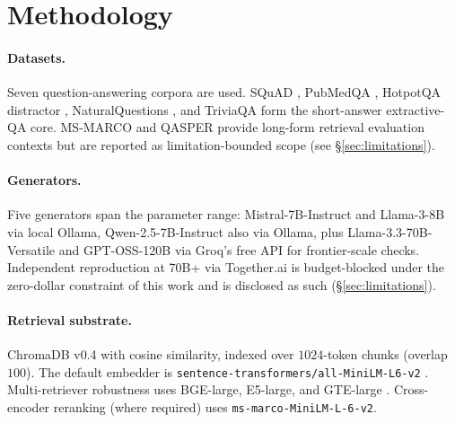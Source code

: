 \section{Methodology}
\label{sec:methodology}

\paragraph{Datasets.}
Seven question-answering corpora are used. SQuAD
\citep{rajpurkar2016squad}, PubMedQA \citep{jin2019pubmedqa},
HotpotQA distractor \citep{yang2018hotpotqa}, NaturalQuestions
\citep{kwiatkowski2019nq}, and TriviaQA \citep{joshi2017triviaqa}
form the short-answer extractive-QA core. MS-MARCO
\citep{nguyen2016msmarco} and QASPER \citep{dasigi2021qasper}
provide long-form retrieval evaluation contexts but are reported as
limitation-bounded scope (see \S\ref{sec:limitations}).

\paragraph{Generators.}
Five generators span the parameter range:
Mistral-7B-Instruct \citep{jiang2023mistral} and Llama-3-8B
\citep{meta2024llama3} via local Ollama, Qwen-2.5-7B-Instruct
\citep{qwen2024} also via Ollama, plus Llama-3.3-70B-Versatile
and GPT-OSS-120B via Groq's free API for frontier-scale checks.
Independent reproduction at 70B+ via Together.ai is
budget-blocked under the zero-dollar constraint of this work and
is disclosed as such (\S\ref{sec:limitations}).

\paragraph{Retrieval substrate.}
ChromaDB v0.4 \citep{chroma2023} with cosine similarity, indexed
over $1024$-token chunks (overlap $100$). The default embedder is
\texttt{sentence-transformers/all-MiniLM-L6-v2}
\citep{reimers2019sbert}. Multi-retriever robustness uses BGE-large,
E5-large, and GTE-large \citep{xiao2023bge,wang2022e5,li2023gte}.
Cross-encoder reranking (where required) uses
\texttt{ms-marco-MiniLM-L-6-v2}.

